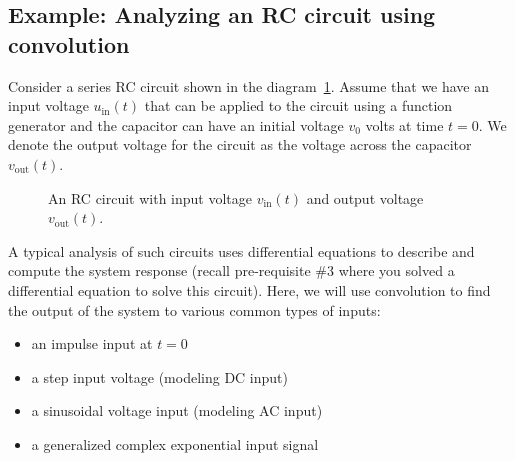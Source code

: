 \subsection{Example: Analyzing an RC circuit using convolution}
Consider a series RC circuit shown in the diagram~\ref{fig:rc-circuit}. Assume that we have an input voltage $u_{\text{in}}(t)$ that can be applied to the circuit using a function generator and the capacitor can have an initial voltage $v_0$ volts at time $t = 0$. We denote the output voltage for the circuit as the voltage across the capacitor $v_{\text{out}}(t)$. 
\begin{figure}
\centering
{}
\caption{An RC circuit with input voltage $v_{\text{in}}(t)$ and output voltage $v_{\text{out}}(t)$.}
\label{fig:rc-circuit}
\end{figure}
A typical analysis of such circuits uses differential equations to describe and compute the system response (recall pre-requisite \#3 where you solved a differential equation to solve this circuit). Here, we will use convolution to find the output of the system to various common types of inputs: 

\begin{itemize}
\item an impulse input at $t=0$
\item a step input voltage (modeling DC input)
\item a sinusoidal voltage input (modeling AC input)
\item a generalized complex exponential input signal
\end{itemize}

